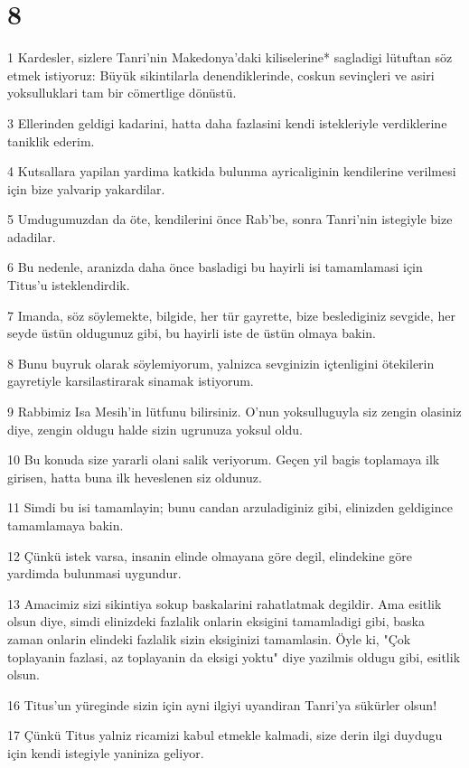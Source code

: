 \chapter{8}

\par 1 Kardesler, sizlere Tanri'nin Makedonya'daki kiliselerine* sagladigi lütuftan söz etmek istiyoruz: Büyük sikintilarla denendiklerinde, coskun sevinçleri ve asiri yoksulluklari tam bir cömertlige dönüstü.
\par 3 Ellerinden geldigi kadarini, hatta daha fazlasini kendi istekleriyle verdiklerine taniklik ederim.
\par 4 Kutsallara yapilan yardima katkida bulunma ayricaliginin kendilerine verilmesi için bize yalvarip yakardilar.
\par 5 Umdugumuzdan da öte, kendilerini önce Rab'be, sonra Tanri'nin istegiyle bize adadilar.
\par 6 Bu nedenle, aranizda daha önce basladigi bu hayirli isi tamamlamasi için Titus'u isteklendirdik.
\par 7 Imanda, söz söylemekte, bilgide, her tür gayrette, bize beslediginiz sevgide, her seyde üstün oldugunuz gibi, bu hayirli iste de üstün olmaya bakin.
\par 8 Bunu buyruk olarak söylemiyorum, yalnizca sevginizin içtenligini ötekilerin gayretiyle karsilastirarak sinamak istiyorum.
\par 9 Rabbimiz Isa Mesih'in lütfunu bilirsiniz. O'nun yoksulluguyla siz zengin olasiniz diye, zengin oldugu halde sizin ugrunuza yoksul oldu.
\par 10 Bu konuda size yararli olani salik veriyorum. Geçen yil bagis toplamaya ilk girisen, hatta buna ilk heveslenen siz oldunuz.
\par 11 Simdi bu isi tamamlayin; bunu candan arzuladiginiz gibi, elinizden geldigince tamamlamaya bakin.
\par 12 Çünkü istek varsa, insanin elinde olmayana göre degil, elindekine göre yardimda bulunmasi uygundur.
\par 13 Amacimiz sizi sikintiya sokup baskalarini rahatlatmak degildir. Ama esitlik olsun diye, simdi elinizdeki fazlalik onlarin eksigini tamamladigi gibi, baska zaman onlarin elindeki fazlalik sizin eksiginizi tamamlasin. Öyle ki, "Çok toplayanin fazlasi, az toplayanin da eksigi yoktu" diye yazilmis oldugu gibi, esitlik olsun.
\par 16 Titus'un yüreginde sizin için ayni ilgiyi uyandiran Tanri'ya sükürler olsun!
\par 17 Çünkü Titus yalniz ricamizi kabul etmekle kalmadi, size derin ilgi duydugu için kendi istegiyle yaniniza geliyor.
